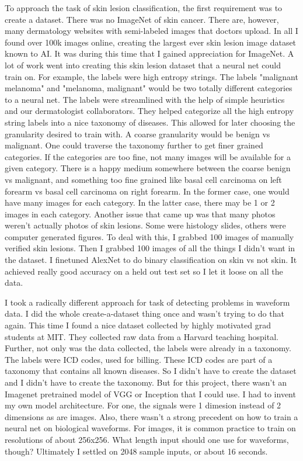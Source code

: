 To approach the task of skin lesion classification, the first requirement was to create a dataset.  There was no ImageNet of skin cancer.  There are, however, many dermatology websites with semi-labeled images that doctors upload.  In all I found over 100k images online, creating the largest ever skin lesion image dataset known to AI.  It was during this time that I gained appreciation for ImageNet.  A lot of work went into creating this skin lesion dataset that a neural net could train on.  For example, the labels were high entropy strings.  The labels "malignant melanoma" and "melanoma, malignant" would be two totally different categories to a neural net.  The labels were streamlined with the help of simple heuristics and our dermatologist collaborators.  They helped categorize all the high entropy string labels into a nice taxonomy of diseases.  This allowed for later choosing the granularity desired to train with.  A coarse granularity would be benign vs malignant.  One could traverse the taxonomy further to get finer grained categories.  If the categories are too fine, not many images will be available for a given category.  There is a happy medium somewhere between the coarse benign vs malignant, and something too fine grained like basal cell carcinoma on left forearm vs basal cell carcinoma on right forearm.  In the former case, one would have many images for each category.  In the latter case, there may be 1 or 2 images in each category.  Another issue that came up was that many photos weren't actually photos of skin lesions.  Some were histology slides, others were computer generated figures.  To deal with this, I grabbed 100 images of manually verified skin lesions.  Then I grabbed 100 images of all the things I didn't want in the dataset.  I finetuned AlexNet to do binary classification on skin vs not skin.  It achieved really good accuracy on a held out test set so I let it loose on all the data.

I took a radically different approach for task of detecting problems in waveform data.  I did the whole create-a-dataset thing once and wasn't trying to do that again.  This time I found a nice dataset collected by highly motivated grad students at MIT.  They collected raw data from a Harvard teaching hospital.  Further, not only was the data collected, the labels were already in a taxonomy.  The labels were ICD codes, used for billing.  These ICD codes are part of a taxonomy that contains all known diseases.  So I didn't have to create the dataset and I didn't have to create the taxonomy.  But for this project, there wasn't an Imagenet pretrained model of VGG or Inception that I could use.  I had to invent my own model architecture.  For one, the signals were 1 dimesion instead of 2 dimensions as are images.  Also, there wasn't a strong precedent on how to train a neural net on biological waveforms.  For images, it is common practice to train on resolutions of about 256x256.  What length input should one use for waveforms, though?  Ultimately I settled on 2048 sample inputs, or about 16 seconds.

